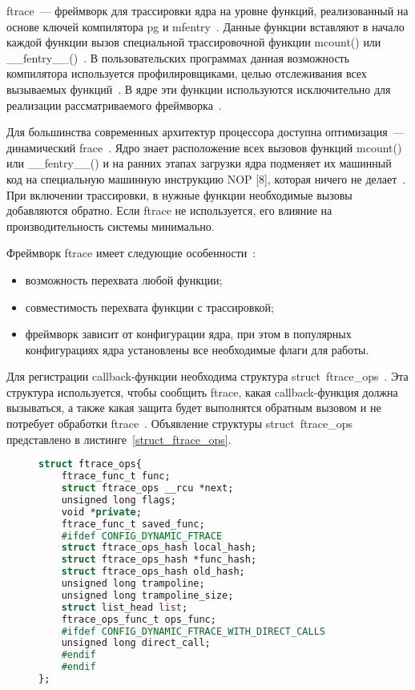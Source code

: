 ftrace~--- фреймворк для трассировки ядра на уровне функций, реализованный на основе ключей компилятора pg и mfentry~\cite{ftrace_com}.
Данные функции вставляют в начало каждой функции вызов специальной трассировочной функции mcount() или \_\_fentry\_\_()~\cite{ftrace_com}.
В пользовательских программах данная возможность компилятора используется профилировщиками, целью отслеживания всех вызываемых функций~\cite{ftrace_com}.
В ядре эти функции используются исключительно для реализации рассматриваемого фреймворка~\cite{ftrace_com}.

Для большинства современных архитектур процессора доступна оптимизация~--- динамический frace~\cite{ftrace_com}.
Ядро знает расположение всех вызовов функций mcount() или \_\_fentry\_\_() и на ранних этапах загрузки ядра подменяет их машинный код на специальную машинную инструкцию NOP [8], которая ничего не делает~\cite{ftrace_com}.
При включении трассировки, в нужные функции необходимые вызовы добавляются обратно.
Если ftrace не используется, его влияние на производительность системы минимально.

Фреймворк ftrace имеет следующие особенности~\cite{ftrace_com}:
\begin{itemize}
	\item возможность перехвата любой функции;
	\item совместимость перехвата функции с трассировкой;
	\item фреймворк зависит от конфигурации ядра, при этом в популярных конфигурациях ядра установлены все необходимые флаги для работы.
\end{itemize}

Для регистрации callback-функции необходима структура struct~ftrace\_ops~\cite{ftrace}.
Эта структура используется, чтобы сообщить ftrace, какая callback-функция должна вызываться, а также какая защита будет выполнятся обратным вызовом и не потребует обработки ftrace~\cite{ftrace}.
Объявление структуры struct~ftrace\_ops представлено в листинге~\ref{struct_ftrace_ops}.
\begin{figure}[H]
	\begin{lstlisting}[label=struct_ftrace_ops,caption=Объявление структуры struct~ftrace\_ops (версия ядра Linux~--- 6.5.13),language=Caml]
struct ftrace_ops{
	ftrace_func_t func;
	struct ftrace_ops __rcu *next;
	unsigned long flags;
	void *private;
	ftrace_func_t saved_func;
	#ifdef CONFIG_DYNAMIC_FTRACE
	struct ftrace_ops_hash local_hash;
	struct ftrace_ops_hash *func_hash;
	struct ftrace_ops_hash old_hash;
	unsigned long trampoline;
	unsigned long trampoline_size;
	struct list_head list;
	ftrace_ops_func_t ops_func;
	#ifdef CONFIG_DYNAMIC_FTRACE_WITH_DIRECT_CALLS
	unsigned long direct_call;
	#endif
	#endif
};
	\end{lstlisting}
\end{figure}


